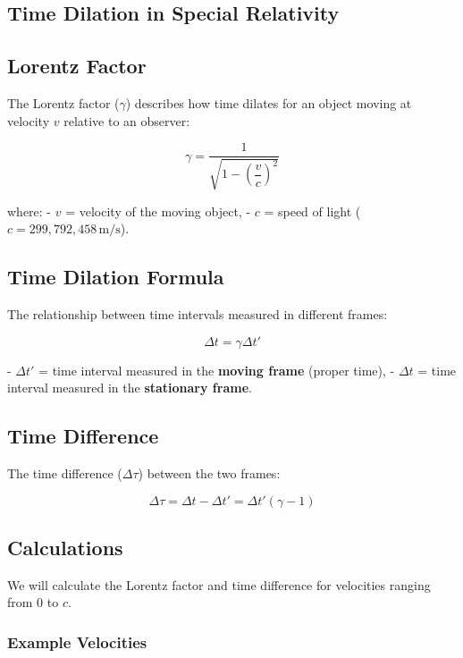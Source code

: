 \documentclass{article}
\begin{document}
\begin{multicols}{2}

\section*{Time Dilation in Special Relativity}

\subsection*{Lorentz Factor}

The Lorentz factor (\(\gamma\)) describes how time dilates for an object moving at velocity \(v\) relative to an observer:

\[
\gamma = \frac{1}{\sqrt{1 - \left( \dfrac{v}{c} \right)^2 }}
\]

where:
- \( v \) = velocity of the moving object,
- \( c \) = speed of light (\( c = 299,792,458\, \text{m/s} \)).

\subsection*{Time Dilation Formula}

The relationship between time intervals measured in different frames:

\[
\Delta t = \gamma \Delta t'
\]

- \( \Delta t' \) = time interval measured in the \textbf{moving frame} (proper time),
- \( \Delta t \) = time interval measured in the \textbf{stationary frame}.

\subsection*{Time Difference}

The time difference (\( \Delta \tau \)) between the two frames:

\[
\Delta \tau = \Delta t - \Delta t' = \Delta t' (\gamma - 1)
\]

\subsection*{Calculations}

We will calculate the Lorentz factor and time difference for velocities ranging from \( 0 \) to \( c \).

\subsubsection*{Example Velocities}


\end{multicols}
\end{document}
